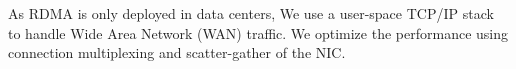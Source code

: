 As RDMA is only deployed in data centers, We use a user-space TCP/IP stack~\cite{dunkels2001design} to handle Wide Area Network (WAN) traffic. We optimize the performance using connection multiplexing and scatter-gather of the NIC.










